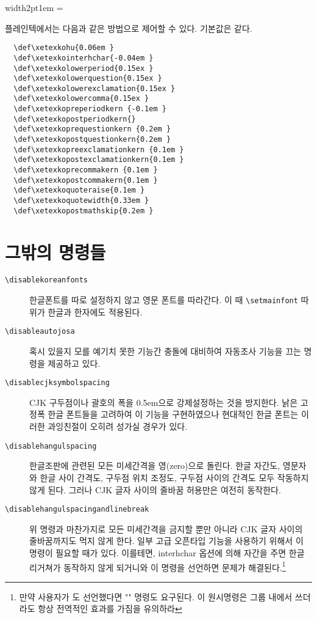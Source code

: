 \documentclass[a4paper]{article}
\def\logoko{\textsf{k}\kern-.1em\textit{o}}
\def\xetexko{\XeTeX\kern-.1ex -\logoko}
\newenvironment{plaintex}
  {\par\medskip\leavevmode\hbox\bgroup
    \color{white!80!black}\vrule width2pt\color{black}\kern1em
    \vbox\bgroup\hsize=\dimexpr\textwidth-12pt\relax
    \small
  }{\egroup\egroup\par\medskip}
\def\cs#1{\texttt{\color{red!70!black}\textbackslash #1}}
\begin{document}
\begin{plaintex}
플레인텍에서는 다음과 같은 방법으로 제어할 수 있다. 기본값은  같다.
\begin{verbatim}
  \def\xetexkohu{0.06em }
  \def\xetexkointerhchar{-0.04em }
  \def\xetexkolowerperiod{0.15ex }
  \def\xetexkolowerquestion{0.15ex }
  \def\xetexkolowerexclamation{0.15ex }
  \def\xetexkolowercomma{0.15ex }
  \def\xetexkopreperiodkern {-0.1em }
  \def\xetexkopostperiodkern{}
  \def\xetexkoprequestionkern {0.2em }
  \def\xetexkopostquestionkern{0.2em }
  \def\xetexkopreexclamationkern {0.1em }
  \def\xetexkopostexclamationkern{0.1em }
  \def\xetexkoprecommakern {0.1em }
  \def\xetexkopostcommakern{0.1em }
  \def\xetexkoquoteraise{0.1em }
  \def\xetexkoquotewidth{0.33em }
  \def\xetexkopostmathskip{0.2em }
\end{verbatim}
\end{plaintex}

\section{그밖의 명령들}
\begin{description}
  \item[\cs{disablekoreanfonts}]
한글폰트를 따로 설정하지 않고 영문 폰트를 따라간다.
이 때  \verb|\setmainfont| 따위가 한글과 한자에도 적용된다.

  \item[\cs{disableautojosa}]
혹시 있을지 모를 예기치 못한 기능간 충돌에 대비하여 자동조사 기능을
끄는 명령을 제공하고 있다.

  \item[\cs{disablecjksymbolspacing}]
CJK 구두점이나 괄호의 폭을 0.5em으로 강제설정하는 것을 방지한다.
 낡은 고정폭 한글 폰트들을 고려하여 이 기능을 구현하였으나
현대적인 한글 폰트는 이러한 과잉친절이 오히려 성가실 경우가 있다.

  \item[\cs{disablehangulspacing}]
한글조판에 관련된 모든 미세간격을 영(zero)으로 돌린다. 한글 자간도,
영문자와 한글 사이 간격도, 구두점 위치 조정도, 구두점 사이의 간격도
모두 작동하지 않게 된다. 그러나 CJK 글자 사이의 줄바꿈 허용만은 여전히
동작한다.

  \item[\cs{disablehangulspacingandlinebreak}]
위 명령과 마찬가지로 모든 미세간격을 금지할 뿐만 아니라 CJK 글자 사이의
줄바꿈까지도 먹지 않게 한다.
일부 고급 오픈타입 기능을 사용하기 위해서 이 명령이 필요할 때가 있다.
이를테면, interhchar 옵션에 의해 자간을 주면 한글 리거쳐가
동작하지 않게 되거니와 이 명령을 선언하면 문제가
해결된다.\footnote{만약 사용자가
  {\ttfamily\string\XeTeXlinebreaklocale}도 선언했다면
  {\ttfamily\string\XeTeXlinebreaklocale""} 명령도 요구된다.
  이 원시명령은 그룹 내에서 쓰더라도 항상 전역적인 효과를 가짐을 유의하라}
\end{description}
\end{document}
